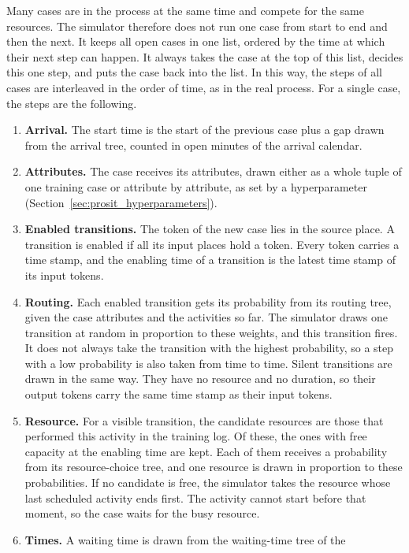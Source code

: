 Many cases are in the process at the same time and compete for the same
resources. The simulator therefore does not run one case from start to end and
then the next. It keeps all open cases in one list, ordered by the time at which
their next step can happen. It always takes the case at the top of this list,
decides this one step, and puts the case back into the list. In this way, the
steps of all cases are interleaved in the order of time, as in the real process.
For a single case, the steps are the following.
\begin{enumerate}[itemsep=2pt,topsep=4pt]
\item \textbf{Arrival.} The start time is the start of the previous case plus a
gap drawn from the arrival tree, counted in open minutes of the arrival
calendar.
\item \textbf{Attributes.} The case receives its attributes, drawn either as a
whole tuple of one training case or attribute by attribute, as set by a
hyperparameter (Section~\ref{sec:prosit_hyperparameters}).
\item \textbf{Enabled transitions.} The token of the new case lies in the source
place. A transition is enabled if all its input places hold a token. Every token
carries a time stamp, and the enabling time of a transition is the latest time
stamp of its input tokens.
\item \textbf{Routing.} Each enabled transition gets its probability from its
routing tree, given the case attributes and the activities so far. The simulator
draws one transition at random in proportion to these weights, and this
transition fires. It does not always take the transition with the highest
probability, so a step with a low probability is also taken from time to time.
Silent transitions are drawn in the same way. They have no resource and no
duration, so their output tokens carry the same time stamp as their input
tokens.
\item \textbf{Resource.} For a visible transition, the candidate resources are
those that performed this activity in the training log. Of these, the ones with
free capacity at the enabling time are kept. Each of them receives a probability
from its resource-choice tree, and one resource is drawn in proportion to these
probabilities. If no candidate is free, the simulator takes the resource whose
last scheduled activity ends first. The activity cannot start before that moment,
so the case waits for the busy resource.
\item \textbf{Times.} A waiting time is drawn from the waiting-time tree of the

\end{enumerate}
